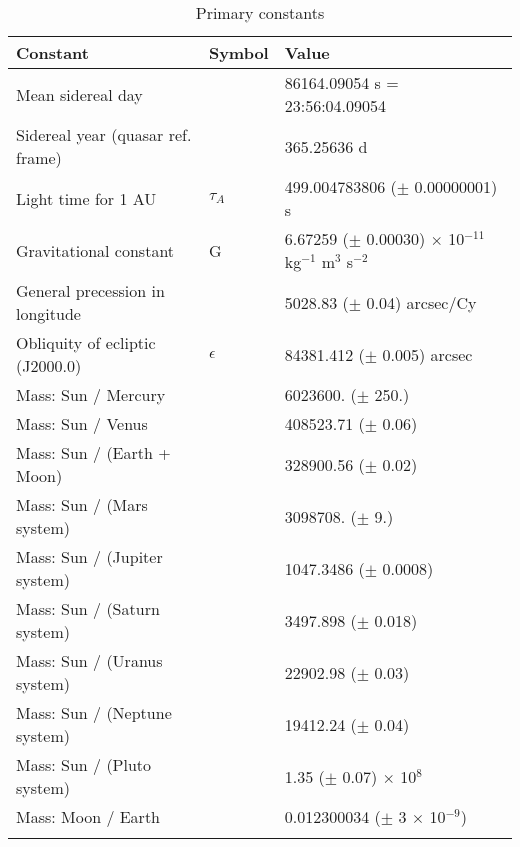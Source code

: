 \documentclass[Orbiter User Manual.tex]{subfiles}
\begin{document}
	\begin{longtable}{ |p{}|p{}|p{}| }
	\hline\rule{0pt}{2ex}
	\textbf{Constant} & \textbf{Symbol} & \textbf{Value}\\
	\hline\rule{0pt}{2ex}
	Mean sidereal day & & 86164.09054 s = 23:56:04.09054\\
	\hline\rule{0pt}{2ex}
	Sidereal year (quasar ref. frame) & & 365.25636 d\\
	\hline\rule{0pt}{2ex}
	Light time for 1 AU & $\tau_{A}$ & 499.004783806 ($\pm$ 0.00000001) s\\
	\hline\rule{0pt}{2ex}
	Gravitational constant & G & 6.67259 ($\pm$ 0.00030) $\times$ 10$^{-11}$ kg$^{-1}$ m$^{3}$ s$^{-2}$\\
	\hline\rule{0pt}{2ex}
	General precession in longitude & & 5028.83 ($\pm$ 0.04) arcsec/Cy\\
	\hline\rule{0pt}{2ex}
	Obliquity of ecliptic (J2000.0) & $\epsilon$ & 84381.412 ($\pm$ 0.005) arcsec\\
	\hline\rule{0pt}{2ex}
	Mass: Sun / Mercury & & 6023600. ($\pm$ 250.)\\
	\hline\rule{0pt}{2ex}
	Mass: Sun / Venus & & 408523.71 ($\pm$ 0.06)\\
	\hline\rule{0pt}{2ex}
	Mass: Sun / (Earth + Moon) & & 328900.56 ($\pm$ 0.02)\\
	\hline\rule{0pt}{2ex}
	Mass: Sun / (Mars system) & & 3098708. ($\pm$ 9.)\\
	\hline\rule{0pt}{2ex}
	Mass: Sun / (Jupiter system) & & 1047.3486 ($\pm$ 0.0008)\\
	\hline\rule{0pt}{2ex}
	Mass: Sun / (Saturn system) & & 3497.898 ($\pm$ 0.018)\\
	\hline\rule{0pt}{2ex}
	Mass: Sun / (Uranus system) & & 22902.98 ($\pm$ 0.03)\\
	\hline\rule{0pt}{2ex}
	Mass: Sun / (Neptune system) & & 19412.24 ($\pm$ 0.04)\\
	\hline\rule{0pt}{2ex}
	Mass: Sun / (Pluto system) & & 1.35 ($\pm$ 0.07) $\times$ 10$^{8}$\\
	\hline\rule{0pt}{2ex}
	Mass: Moon / Earth & & 0.012300034 ($\pm$ 3 $\times$ 10$^{-9}$)\\
	\hline
	\caption{Primary constants}
	\end{longtable}
\end{document}
